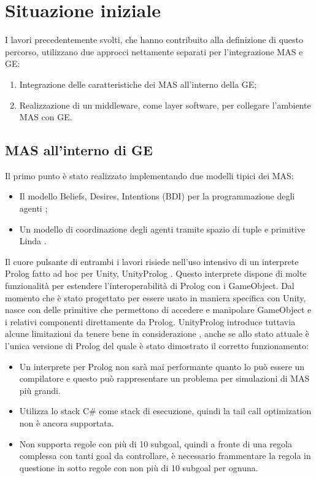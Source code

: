 \section{Situazione iniziale}

I lavori precedentemente svolti, che hanno contribuito alla definizione di questo percorso, utilizzano due approcci nettamente separati per l'integrazione MAS e GE:
\begin{enumerate}
	\item Integrazione delle caratteristiche dei MAS all'interno della GE;
	\item Realizzazione di un middleware, come layer software, per collegare l'ambiente MAS con GE.
\end{enumerate}

\subsection{MAS all'interno di GE} \label{MAS_dentro_GE}

Il primo punto è stato realizzato implementando due modelli tipici dei MAS:
\begin{itemize}
	\item Il modello Beliefs, Desires, Intentions (BDI) per la programmazione degli agenti \cite{amslaurea15657};
	\item Un modello di coordinazione degli agenti tramite spazio di tuple e primitive Linda \cite{amslaurea8424}\cite{amslaurea16100}.
\end{itemize}

Il cuore pulsante di entrambi i lavori risiede nell'uso intensivo di un interprete Prolog fatto ad hoc per Unity, UnityProlog \cite{unity_prolog}. Questo interprete dispone di molte funzionalità per estendere l'interoperabilità di Prolog con i GameObject.
Dal momento che è stato progettato per essere usato in maniera specifica con Unity, nasce con delle primitive che permettono di accedere e manipolare GameObject e i relativi componenti direttamente da Prolog. UnityProlog introduce tuttavia alcune limitazioni da tenere bene in considerazione \cite{amslaurea15657}, anche se allo stato attuale è l'unica versione di Prolog del quale è stato dimostrato il corretto funzionamento:
\begin{itemize}
	\item Un interprete per Prolog non sarà mai performante quanto lo può essere un compilatore e questo può rappresentare un problema per simulazioni di MAS più grandi.
	\item Utilizza lo stack C\# come stack di esecuzione, quindi la tail call optimization non è ancora supportata.
	\item Non supporta regole con più di 10 subgoal, quindi a fronte di una regola complessa con tanti goal da controllare, è necessario frammentare la regola in questione in sotto regole con non più di 10 subgoal per ognuna.
\end{itemize}

